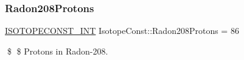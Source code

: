 \subsubsection{\texorpdfstring{Radon208\+Protons}{Radon208Protons}}
{\footnotesize\ttfamily \mbox{\hyperlink{group___isotope_const-_macros_ga5f18360b3e99483a35c32d789e62621c}{I\+S\+O\+T\+O\+P\+E\+C\+O\+N\+S\+T\+\_\+\+I\+NT}} Isotope\+Const\+::\+Radon208\+Protons = 86}

\$ \$ Protons in Radon-\/208. 
